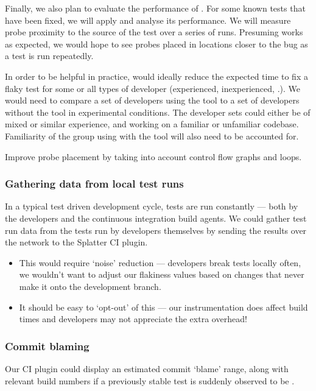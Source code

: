 Finally, we also plan to evaluate the performance of \splatter. For some known
\flaky tests that have been fixed, we will apply \splatter and analyse its
performance. We will measure probe proximity to the source of the \flaky test
over a series of runs. Presuming \splatter works as expected, we would hope to
see probes placed in locations closer to the bug as a test is run repeatedly.

In order to be helpful in practice, \splatter would ideally reduce the expected
time to fix a flaky test for some or all types of developer (experienced,
inexperienced, \etc.). We would need to compare a set of developers using the
tool to a set of developers without the tool in experimental conditions. The
developer sets could either be of mixed or similar experience, and working on a
familiar or unfamiliar codebase. Familiarity of the group using \splatter with
the tool will also need to be accounted for.

Improve probe placement by taking into account control flow graphs
and loops.

\subsubsection{Gathering data from local test runs}

In a typical test driven development cycle, tests are run constantly --- both by
the developers and the continuous integration build agents. We could gather test
run data from the tests run by developers themselves by sending the results over
the network to the Splatter CI plugin.

\begin{itemize}
	\item This would require {\lq}noise{\rq} reduction --- developers break tests
	locally often, we wouldn't want to adjust our flakiness values based on
	changes that never make it onto the development branch.
	\item It should be easy to {\lq}opt-out{\rq} of this --- our instrumentation
	does affect build times and developers may not appreciate the extra overhead!
\end{itemize}

\subsubsection{Commit blaming}

Our CI plugin could display an estimated commit {\lq}blame{\rq} range, along
with relevant build numbers if a previously stable test is suddenly observed to
be \flaky.

